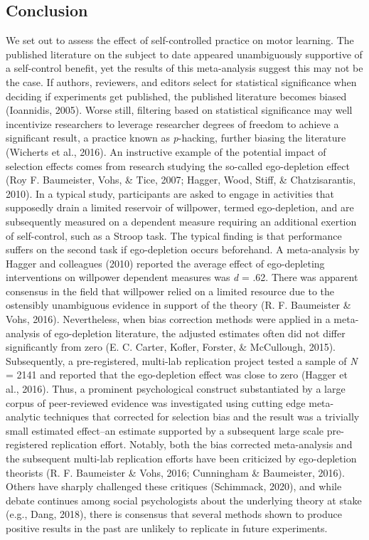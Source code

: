\documentclass[
  english,
  man, donotrepeattitle,floatsintext]{apa7}
\begin{document}
\hypertarget{conclusion}{%
\subsection{Conclusion}\label{conclusion}}

We set out to assess the effect of self-controlled practice on motor learning. The published literature on the subject to date appeared unambiguously supportive of a self-control benefit, yet the results of this meta-analysis suggest this may not be the case. If authors, reviewers, and editors select for statistical significance when deciding if experiments get published, the published literature becomes biased (Ioannidis, 2005). Worse still, filtering based on statistical significance may well incentivize researchers to leverage researcher degrees of freedom to achieve a significant result, a practice known as \emph{p}-hacking, further biasing the literature (Wicherts et al., 2016). An instructive example of the potential impact of selection effects comes from research studying the so-called ego-depletion effect (Roy F. Baumeister, Vohs, \& Tice, 2007; Hagger, Wood, Stiff, \& Chatzisarantis, 2010). In a typical study, participants are asked to engage in activities that supposedly drain a limited reservoir of willpower, termed ego-depletion, and are subsequently measured on a dependent measure requiring an additional exertion of self-control, such as a Stroop task. The typical finding is that performance suffers on the second task if ego-depletion occurs beforehand. A meta-analysis by Hagger and colleagues (2010) reported the average effect of ego-depleting interventions on willpower dependent measures was \emph{d} = .62. There was apparent consensus in the field that willpower relied on a limited resource due to the ostensibly unambiguous evidence in support of the theory (R. F. Baumeister \& Vohs, 2016). Nevertheless, when bias correction methods were applied in a meta-analysis of ego-depletion literature, the adjusted estimates often did not differ significantly from zero (E. C. Carter, Kofler, Forster, \& McCullough, 2015). Subsequently, a pre-registered, multi-lab replication project tested a sample of \emph{N} = 2141 and reported that the ego-depletion effect was close to zero (Hagger et al., 2016). Thus, a prominent psychological construct substantiated by a large corpus of peer-reviewed evidence was investigated using cutting edge meta-analytic techniques that corrected for selection bias and the result was a trivially small estimated effect--an estimate supported by a subsequent large scale pre-registered replication effort. Notably, both the bias corrected meta-analysis and the subsequent multi-lab replication efforts have been criticized by ego-depletion theorists (R. F. Baumeister \& Vohs, 2016; Cunningham \& Baumeister, 2016). Others have sharply challenged these critiques (Schimmack, 2020), and while debate continues among social psychologists about the underlying theory at stake (e.g., Dang, 2018), there is consensus that several methods shown to produce positive results in the past are unlikely to replicate in future experiments.
\end{document}
